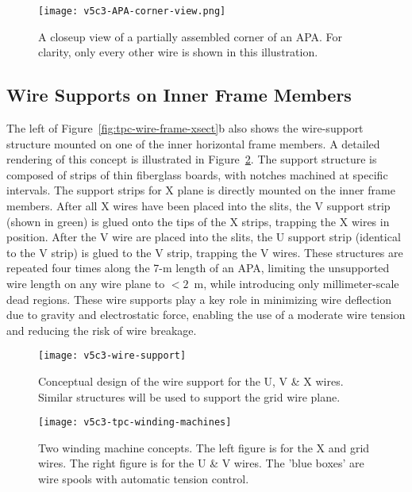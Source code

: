\begin{figure}[htbp]
\centering
\texttt{[image: v5c3-APA-corner-view.png]}
\caption[Closeup view of a partially assembled corner of an APA]{A closeup view of a partially assembled corner of an APA.  For clarity, only every other wire is shown in this illustration.  }
\label{fig:tpc-APA-corner}
\end{figure}

\subsection{Wire Supports on Inner Frame Members}

The left of Figure~\ref{fig:tpc-wire-frame-xsect}b also shows the wire-support 
structure mounted on one of the inner horizontal frame members. 
A detailed rendering of this concept is illustrated in 
Figure~\ref{fig:tpc-wire-support}. The support structure is composed of
strips of thin fiberglass boards, with notches machined at specific 
intervals. The support strips for X plane is directly mounted on the 
inner frame members.  After all X wires have been placed into the slits, 
the V support strip (shown in green) is glued onto the tips of the 
X strips, trapping the X wires in position.  After the V wire are placed 
into the slits, the U support strip (identical to the V strip) is glued 
to the V strip, trapping the V wires. These structures are 
repeated four times along the 7-m length of an APA, limiting the unsupported 
wire length on any wire plane to $< 2$~m, while introducing 
only millimeter-scale dead regions. These wire supports play a key role 
in minimizing wire deflection due to gravity and electrostatic force, 
enabling the use of a moderate wire tension and reducing the 
risk of wire breakage. 


\begin{figure}[htpb]
\centering
\texttt{[image: v5c3-wire-support]}
\caption[Conceptual design of the wire support for the U, V \& X wires]{Conceptual design of the wire support for the U, V \& X wires.  
Similar structures will be used to support the grid wire plane.}
\label{fig:tpc-wire-support}
\end{figure}

\begin{figure}[htpb]
\centering
\texttt{[image: v5c3-tpc-winding-machines]}
\caption[Two winding machine concepts]{Two winding machine concepts. The left figure is for the X and grid wires.
The right figure is for the U \& V wires.  The 'blue boxes' are wire spools 
with automatic tension control.}
\label{fig:tpc-winding-machine}
\end{figure}

